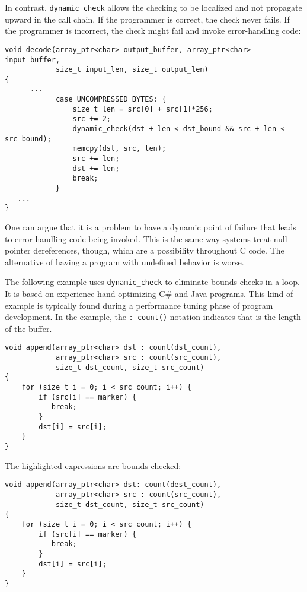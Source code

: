 In contrast, \texttt{dynamic\_check} allows the checking to be localized
and not propagate upward in the call chain. If the programmer is
correct, the check never fails. If the programmer is incorrect, the
check might fail and invoke error-handling code:

\begin{verbatim}
void decode(array_ptr<char> output_buffer, array_ptr<char> input_buffer, 
            size_t input_len, size_t output_len)
{
      ...
            case UNCOMPRESSED_BYTES: { 
                size_t len = src[0] + src[1]*256;
                src += 2;
                dynamic_check(dst + len < dst_bound && src + len < src_bound);
                memcpy(dst, src, len);
                src += len;
                dst += len;                
                break;
            }
   ...
}
\end{verbatim}

One can argue that it is a problem to have a dynamic point of failure
that leads to error-handling code being invoked. This is the same way
systems treat null pointer dereferences, though, which are a possibility
throughout C code. The alternative of having a program with undefined
behavior is worse.

The following example uses \texttt{dynamic\_check} to eliminate bounds
checks in a loop. It is based on experience hand-optimizing C\# and Java
programs. This kind of example is typically found during a performance
tuning phase of program development. In the example, 
the \verb|: count(|\verb|)| notation indicates that  is the
length of the buffer.

\begin{verbatim}
void append(array_ptr<char> dst : count(dst_count),
            array_ptr<char> src : count(src_count), 
            size_t dst_count, size_t src_count)
{ 
    for (size_t i = 0; i < src_count; i++) {
        if (src[i] == marker) {
           break;
        }
        dst[i] = src[i];
    }
}
\end{verbatim}

The highlighted expressions are bounds checked:
\begin{verbatim}
void append(array_ptr<char> dst: count(dest_count), 
            array_ptr<char> src : count(src_count), 
            size_t dst_count, size_t src_count)
{ 
    for (size_t i = 0; i < src_count; i++) {
        if (src[i] == marker) {
           break;
        }
        dst[i] = src[i];
    }
}
\end{verbatim}

